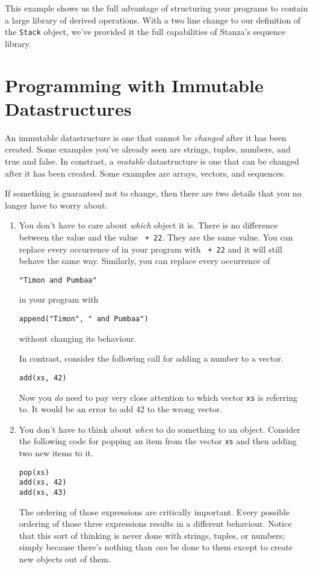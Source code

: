 \documentclass[10pt,oneside]{book}
\begin{document}
This example shows us the full advantage of structuring your programs to contain a large library of derived operations. With a two line change to our definition of the \texttt{\frenchspacing Stack} object, we've provided it the full capabilities of Stanza's sequence library.  

\chapter{Programming with Immutable Datastructures}
An immutable datastructure is one that cannot be {\em changed} after it has been created. Some examples you've already seen are strings, tuples, numbers, and true and false. In constrast, a {\em mutable} datastructure is one that can be changed after it has been created. Some examples are arrays, vectors, and sequences. 

If something is guaranteed not to change, then there are two details that you no longer have to worry about.
\begin{enumerate}
\item You don't have to care about {\em which} object it is. There is no difference between the value \texttt{} and the value \texttt{ + 22}. They are the same value. You can replace every occurrence of \texttt{} in your program with \texttt{ + 22} and it will still behave the same way. Similarly, you can replace every occurrence of 
\begin{lstlisting}
"Timon and Pumbaa"
\end{lstlisting}
in your program with 
\begin{lstlisting}
append("Timon", " and Pumbaa")
\end{lstlisting}
without changing its behaviour. 

In contrast, consider the following call for adding a number to a vector.
\begin{lstlisting}
add(xs, 42)
\end{lstlisting}
Now you {\em do} need to pay very close attention to which vector \texttt{\frenchspacing xs} is referring to. It would be an error to add 42 to the wrong vector.

\item You don't have to think about {\em when} to do something to an object. Consider the following code for popping an item from the vector \texttt{\frenchspacing xs} and then adding two new items to it.
\begin{lstlisting}
pop(xs)
add(xs, 42)
add(xs, 43)
\end{lstlisting}
The ordering of those expressions are critically important. Every possible ordering of those three expressions results in a different behaviour. Notice that this sort of thinking is never done with strings, tuples, or numbers; simply because there's nothing than {\em can} be done to them except to create new objects out of them.
\end{enumerate} 
\end{document}
